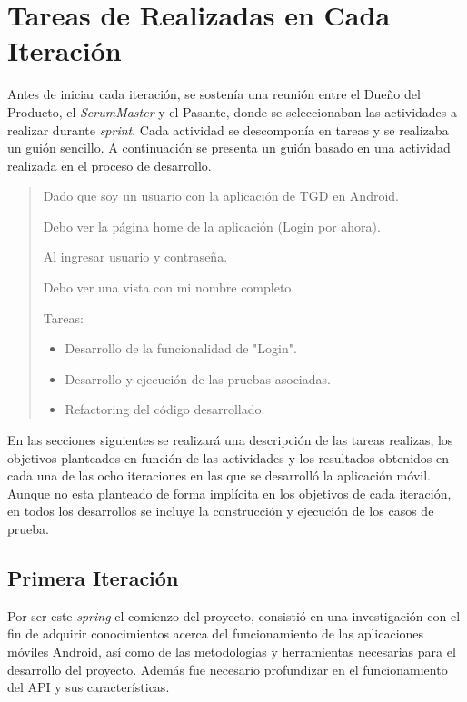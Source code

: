 \section{Tareas de Realizadas en Cada Iteración}

Antes de iniciar cada iteración, se sostenía una reunión entre el Dueño del Producto, el \textit{ScrumMaster} y el Pasante, donde se seleccionaban las actividades a realizar durante \textit{sprint}. Cada actividad se descomponía en tareas y se realizaba un guión sencillo. A continuación se presenta un guión basado en una actividad realizada en el proceso de desarrollo.

\begin{quotation}

Dado que soy un usuario con la aplicación de TGD en Android.
 
Debo ver la página home de la aplicación (Login por ahora).

Al ingresar usuario y contraseña. 

Debo ver una vista con mi nombre completo. 

Tareas: 
\begin{itemize}
\item Desarrollo de la funcionalidad de "Login".
\item Desarrollo y ejecución de las pruebas asociadas.
\item Refactoring del código desarrollado.
\end{itemize}
\end{quotation}

En las secciones siguientes se realizará una descripción de las tareas realizas, los objetivos planteados en función de las actividades y los resultados obtenidos en cada una de las ocho iteraciones en las que se desarrolló la aplicación móvil. Aunque no esta planteado de forma implícita en los objetivos de cada iteración, en todos los desarrollos se incluye la construcción y ejecución de los casos de prueba.

\subsection{Primera Iteración}

Por ser este \textit{spring} el comienzo del proyecto, consistió en una investigación con el fin de adquirir conocimientos acerca del funcionamiento de las aplicaciones móviles Android, así como de las metodologías y herramientas necesarias para el desarrollo del proyecto. Además fue necesario profundizar en el funcionamiento del API y sus características.

